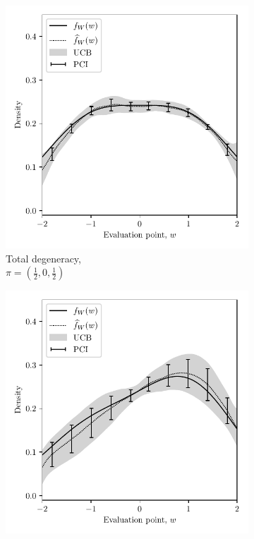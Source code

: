 \begin{figure}[ht]
  \centering
  \begin{subfigure}{0.32\textwidth}
    \centering
    \includegraphics[scale=0.48]{graphics/result_total.pdf}
    \caption{
      Total degeneracy, \\
      $\pi = \left( \frac{1}{2}, 0, \frac{1}{2} \right)$
    }
  \end{subfigure}
  \begin{subfigure}{0.32\textwidth}
    \centering
    \includegraphics[scale=0.48]{graphics/result_partial.pdf}

\end{subfigure}
\end{figure}
